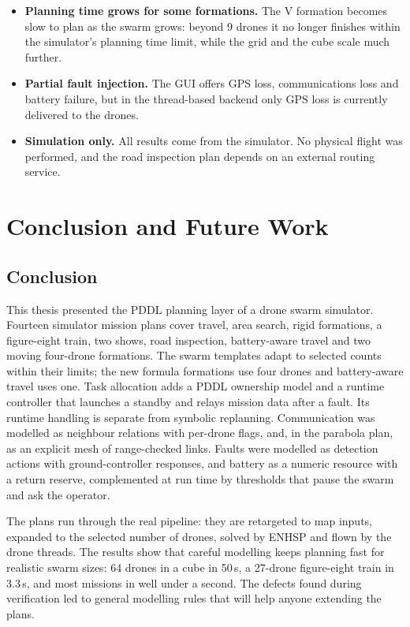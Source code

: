 \documentclass[11pt,a4paper,oneside]{report}
\newcommand{\maxV}{9}
\begin{document}
\begin{itemize}[itemsep=5pt]
  \item \textbf{Planning time grows for some formations.} The V formation becomes slow to plan as
        the swarm grows: beyond \maxV{} drones it no longer finishes within the simulator's
        planning time limit, while the grid and the cube scale much further.
  \item \textbf{Partial fault injection.} The GUI offers GPS loss, communications loss and battery
        failure, but in the thread-based backend only GPS loss is currently delivered to the
        drones.
  \item \textbf{Simulation only.} All results come from the simulator. No physical flight was
        performed, and the road inspection plan depends on an external routing service.
\end{itemize}

\chapter{Conclusion and Future Work}\label{ch:conclusion}

\section{Conclusion}
This thesis presented the PDDL planning layer of a drone swarm simulator. Fourteen simulator
mission plans cover travel, area search, rigid formations, a figure-eight train, two shows,
road inspection, battery-aware travel and two moving four-drone formations. The swarm templates
adapt to selected counts within their limits; the new formula formations use four drones and
battery-aware travel uses one. Task allocation adds a PDDL ownership model and a runtime controller that launches a standby
and relays mission data after a fault. Its runtime handling is separate from symbolic replanning. Communication was modelled as neighbour relations with
per-drone flags, and, in the parabola plan, as an explicit mesh of range-checked links. Faults
were modelled as detection actions with ground-controller responses, and battery as a numeric
resource with a return reserve, complemented at run time by thresholds that pause the swarm and
ask the operator.

The plans run through the real pipeline: they are retargeted to map inputs, expanded to the
selected number of drones, solved by ENHSP and flown by the drone threads. The results show that
careful modelling keeps planning fast for realistic swarm sizes: 64 drones in a cube in 50\,s,
a 27-drone figure-eight train in 3.3\,s, and most missions in well under a second. The defects
found during verification led to general modelling rules that will help anyone extending the
plans.
\end{document}
